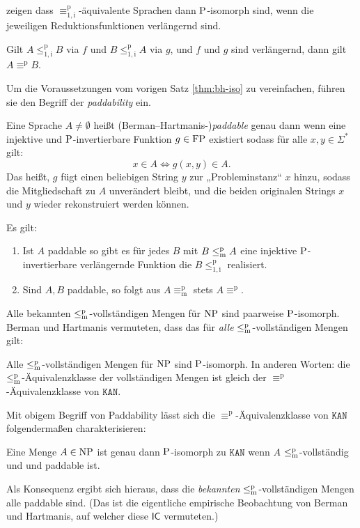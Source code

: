 \textcite{berman_isomorphisms_1977} zeigen dass $\equiv_\mathrm{1,i}^\mathrm{p}$-äquivalente Sprachen dann $\P$-isomorph sind, wenn die jeweiligen Reduktionsfunktionen verlängernd sind.
\begin{theorem}\label{thm:bh-iso}
    Gilt $A\leq_\mathrm{1,i}^\mathrm{p} B$ via $f$ und $B\leq_\mathrm{1,i}^\mathrm{p} A$ via $g$, und $f$ und $g$ sind verlängernd, dann gilt $A\equiv^\mathrm{p}B$.
\end{theorem}
Um die Voraussetzungen vom vorigen Satz \ref{thm:bh-iso} zu vereinfachen, führen sie den Begriff der \emph{paddability} ein.
\begin{definition}
    Eine Sprache $A\neq\emptyset$ heißt (Berman–Hartmanis-)\emph{paddable} genau dann wenn eine injektive und $\P$-invertierbare Funktion $g\in \FP$ existiert sodass für alle $x,y\in\Sigma^*$ gilt:
    \[ x\in A \iff g(x,y)\in A. \]
    Das heißt, $g$ fügt einen beliebigen String $y$ zur „Probleminstanz“ $x$ hinzu, sodass die Mitgliedschaft zu $A$ unverändert bleibt, und die beiden originalen Strings $x$ und $y$ wieder rekonstruiert werden können. 
\end{definition}
Es gilt:
\begin{theorem}
    \begin{enumerate}
        \item Ist $A$ paddable so gibt es für jedes $B$ mit $B\leqmp A$ eine injektive $\P$-invertierbare verlängernde Funktion die $B\leq_\mathrm{1,i}^\mathrm{p}$ realisiert.
        \item Sind $A, B$ paddable, so folgt aus $A\equiv_\mathrm{m}^\mathrm{p}$ stets $A\equiv^\mathrm{p}$.
    \end{enumerate}
\end{theorem}
Alle bekannten $\leqmp$-vollständigen Mengen für $\NP$ sind paarweise $\P$-isomorph. 
Berman und Hartmanis vermuteten, dass das für \emph{alle} $\leqmp$-vollständigen Mengen gilt:
\begin{conjecture}[$\mathsf{IC}$]
    Alle $\leqmp$-vollständigen Mengen für $\NP$ sind $\P$-isomorph.
    In anderen Worten: die $\leqmp$-Äquivalenzklasse der vollständigen Mengen ist gleich der  $\equiv^\mathrm{p}$-Äquivalenzklasse von $\mathtt{KAN}$.
\end{conjecture}
Mit obigem Begriff von Paddability lässt sich die $\equiv^\mathrm{p}$-Äquivalenzklasse von $\mathtt{KAN}$ folgendermaßen charakterisieren:
\begin{theorem}
    Eine Menge $A\in\NP$ ist genau dann $\P$-isomorph zu $\mathtt{KAN}$ wenn $A$ $\leqmp$-vollständig und und paddable ist.
\end{theorem}
Als Konsequenz ergibt sich hieraus, dass die \emph{bekannten} $\leqmp$-vollständigen Mengen alle paddable sind. (Das ist die eigentliche empirische Beobachtung von Berman und Hartmanis, auf welcher diese $\mathsf{IC}$ vermuteten.)

